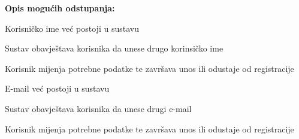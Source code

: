 \begin{packed_item}
\begin{packed_enum}
						\end{packed_enum}
					
						\item  \textbf{Opis mogućih odstupanja:}
					
						\item[] \begin{packed_item}
	
							\item[1.a] Korisničko ime već postoji u sustavu
							\item[] \begin{packed_enum}
								
								\item Sustav obavještava korisnika da unese drugo korinsičko ime
								\item Korisnik mijenja potrebne podatke te završava unos ili odustaje od registracije
								
								
								\end{packed_enum}
							\item[2.a] E-mail već postoji u sustavu
							\item[] \begin{packed_enum}
								
								\item Sustav obavještava korisnika da unese drugi e-mail
								\item Korisnik mijenja potrebne podatke te završava unos ili odustaje od registracije
								\end{packed_enum}
							
							
							\end{packed_item}
					\end{packed_item}
				
